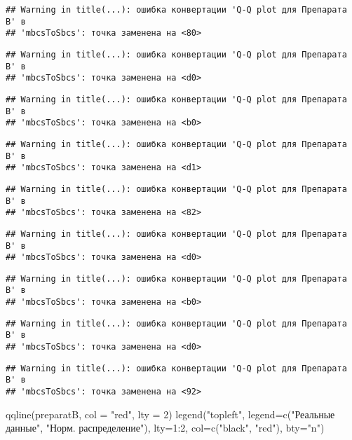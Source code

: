 \documentclass[
]{article}
\newenvironment{Shaded}{\begin{snugshade}}{\end{snugshade}}
\newcommand{\AttributeTok}[1]{\textcolor[rgb]{0.77,0.63,0.00}{#1}}
\newcommand{\DecValTok}[1]{\textcolor[rgb]{0.00,0.00,0.81}{#1}}
\newcommand{\FunctionTok}[1]{\textcolor[rgb]{0.00,0.00,0.00}{#1}}
\newcommand{\NormalTok}[1]{#1}
\newcommand{\SpecialCharTok}[1]{\textcolor[rgb]{0.00,0.00,0.00}{#1}}
\newcommand{\StringTok}[1]{\textcolor[rgb]{0.31,0.60,0.02}{#1}}
\begin{document}
\begin{verbatim}
## Warning in title(...): ошибка конвертации 'Q-Q plot для Препарата В' в
## 'mbcsToSbcs': точка заменена на <80>
\end{verbatim}

\begin{verbatim}
## Warning in title(...): ошибка конвертации 'Q-Q plot для Препарата В' в
## 'mbcsToSbcs': точка заменена на <d0>
\end{verbatim}

\begin{verbatim}
## Warning in title(...): ошибка конвертации 'Q-Q plot для Препарата В' в
## 'mbcsToSbcs': точка заменена на <b0>
\end{verbatim}

\begin{verbatim}
## Warning in title(...): ошибка конвертации 'Q-Q plot для Препарата В' в
## 'mbcsToSbcs': точка заменена на <d1>
\end{verbatim}

\begin{verbatim}
## Warning in title(...): ошибка конвертации 'Q-Q plot для Препарата В' в
## 'mbcsToSbcs': точка заменена на <82>
\end{verbatim}

\begin{verbatim}
## Warning in title(...): ошибка конвертации 'Q-Q plot для Препарата В' в
## 'mbcsToSbcs': точка заменена на <d0>
\end{verbatim}

\begin{verbatim}
## Warning in title(...): ошибка конвертации 'Q-Q plot для Препарата В' в
## 'mbcsToSbcs': точка заменена на <b0>
\end{verbatim}

\begin{verbatim}
## Warning in title(...): ошибка конвертации 'Q-Q plot для Препарата В' в
## 'mbcsToSbcs': точка заменена на <d0>
\end{verbatim}

\begin{verbatim}
## Warning in title(...): ошибка конвертации 'Q-Q plot для Препарата В' в
## 'mbcsToSbcs': точка заменена на <92>
\end{verbatim}

\begin{Shaded}
\begin{Highlighting}[]
\FunctionTok{qqline}\NormalTok{(preparatB, }\AttributeTok{col =} \StringTok{"red"}\NormalTok{, }\AttributeTok{lty =} \DecValTok{2}\NormalTok{)}
\FunctionTok{legend}\NormalTok{(}\StringTok{"topleft"}\NormalTok{, }\AttributeTok{legend=}\FunctionTok{c}\NormalTok{(}\StringTok{"Реальные данные"}\NormalTok{, }\StringTok{"Норм. распределение"}\NormalTok{), }\AttributeTok{lty=}\DecValTok{1}\SpecialCharTok{:}\DecValTok{2}\NormalTok{, }\AttributeTok{col=}\FunctionTok{c}\NormalTok{(}\StringTok{"black"}\NormalTok{, }\StringTok{"red"}\NormalTok{), }\AttributeTok{bty=}\StringTok{"n"}\NormalTok{)}
\end{Highlighting}
\end{Shaded}
\end{document}
